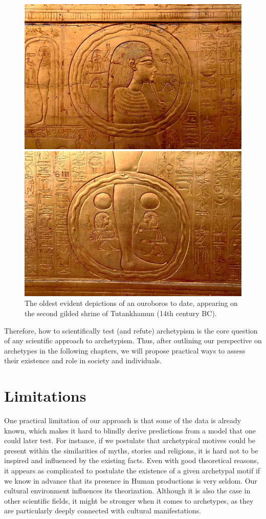 \documentclass[
]{book}
\begin{document}
\begin{figure}

{\centering \includegraphics[width=0.49\linewidth]{img/ouroboros_tutankhumon} 

}

\caption{The oldest evident depictions of an ouroboros to date, appearing on the second gilded shrine of Tutankhamun (14th century BC).}\label{fig:unnamed-chunk-14}
\end{figure}

Therefore, how to scientifically test (and refute) archetypism is the core question of any scientific approach to archetypism. Thus, after outlining our perspective on archetypes in the following chapters, we will propose practical ways to assess their existence and role in society and individuals.

\hypertarget{limitations}{%
\section{Limitations}\label{limitations}}

One practical limitation of our approach is that some of the data is already known, which makes it hard to blindly derive predictions from a model that one could later test. For instance, if we postulate that archetypical motives could be present within the similarities of myths, stories and religions, it is hard not to be inspired and influenced by the existing facts. Even with good theoretical reasons, it appears as complicated to postulate the existence of a given archetypal motif if we know in advance that its presence in Human productions is very seldom. Our cultural environment influences its theorization. Although it is also the case in other scientific fields, it might be stronger when it comes to archetypes, as they are particularly deeply connected with cultural manifestations.
\end{document}
